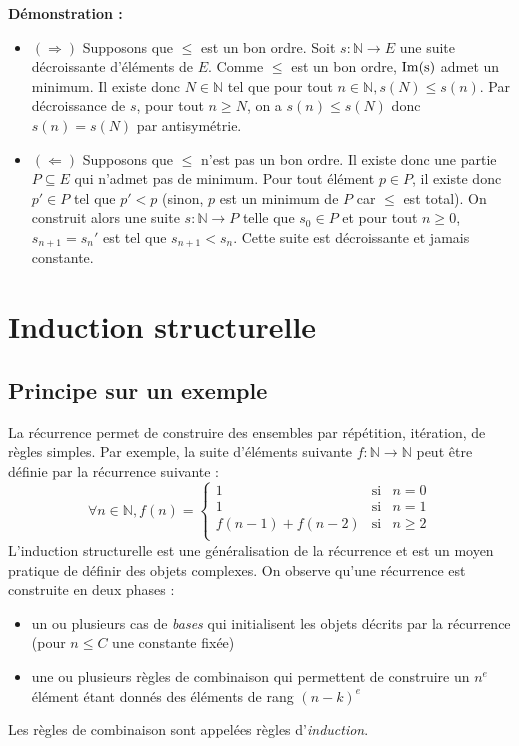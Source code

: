 \documentclass[../../main.tex]{subfiles}
\begin{document}
\textbf{Démonstration :}
\begin{itemize}
	\item $(\Rightarrow)$ Supposons que $\leq$ est un bon ordre. Soit $s:\mathbb{N}\rightarrow E$ une suite décroissante d'éléments de $E$. Comme $\leq$ est un bon ordre, $\rm{Im}(s)$ admet un minimum. Il existe donc $N\in\mathbb{N}$ tel que pour tout $n\in\mathbb{N}, s(N) \leq s(n)$. Par décroissance de $s$, pour tout $n\geq N$, on a $s(n) \leq s(N)$ donc $s(n) = s(N)$ par antisymétrie.
	\item $(\Leftarrow)$ Supposons que $\leq$ n'est pas un bon ordre. Il existe donc une partie $P\subseteq E$ qui n'admet pas de minimum. Pour tout élément $p\in P$, il existe donc $p'\in P$ tel que $p'< p$ (sinon, $p$ est un minimum de $P$ car $\leq$ est total). On construit alors une suite $s:\mathbb{N}\rightarrow P$ telle que $s_0\in P$ et pour tout $n\geq 0$, $s_{n+1} = s_n'$ est tel que $s_{n+1}< s_n$. Cette suite est décroissante et jamais constante.
\end{itemize}
\section{Induction structurelle}
\label{sec:induction_structurelle}
\subsection{Principe sur un exemple}
La récurrence permet de construire des ensembles par répétition, itération, de règles simples. Par exemple, la suite d'éléments suivante $f : \mathbb{N} \rightarrow \mathbb{N}$ peut être définie par la récurrence suivante :
$$
\forall n\in\mathbb{N}, f(n) = \left\{\begin{array}{ccl}
1 & \text{si}& n = 0 \\
1 & \text{si}& n = 1 \\
f(n-1) + f(n-2) & \text{si}& n \geq 2 \\
\end{array}\right.
$$
L'induction structurelle est une généralisation de la récurrence et est un moyen pratique de définir des objets complexes. On observe qu'une récurrence est construite en deux phases :
\begin{itemize}
	\item un ou plusieurs cas de \textit{bases} qui initialisent les objets décrits par la récurrence (pour $n \leq C$ une constante fixée)
	\item une ou plusieurs règles de combinaison qui permettent de construire un $n^e$ élément étant donnés des éléments de rang $(n-k)^e$
\end{itemize}
Les règles de combinaison sont appelées règles d'\textit{induction}.
\end{document}
